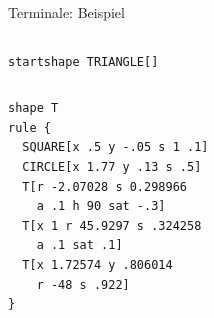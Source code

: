 \documentclass{beamer}
\theoremstyle{example}
\begin{document}
\begin{frame}{Terminale: Beispiel}
\begin{columns}
    \lstinline!startshape TRIANGLE[]!
    \begin{center}
    \end{center}
  \end{columns}
\end{frame}

\begin{lrbox}{\mybox}
\begin{lstlisting}[name=beispiel]
shape T
rule {
  SQUARE[x .5 y -.05 s 1 .1]
  CIRCLE[x 1.77 y .13 s .5]
  T[r -2.07028 s 0.298966
    a .1 h 90 sat -.3]
  T[x 1 r 45.9297 s .324258
    a .1 sat .1]
  T[x 1.72574 y .806014
    r -48 s .922]
} 
\end{lstlisting}
\end{lrbox}
\end{document}
